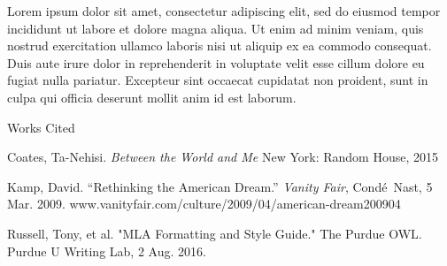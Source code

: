\documentclass[12pt]{article}
\newcommand{\bibent}{\noindent \hangindent 40pt}
\newenvironment{workscited}{\begin{center} Works Cited \end{center}}{\newpage }
\begin{document}
\begin{flushleft}
Lorem ipsum dolor sit amet, consectetur adipiscing elit, sed do eiusmod tempor incididunt ut labore et dolore magna aliqua. Ut enim ad minim veniam, quis nostrud exercitation ullamco laboris nisi ut aliquip ex ea commodo consequat. Duis aute irure dolor in reprehenderit in voluptate velit esse cillum dolore eu fugiat nulla pariatur. Excepteur sint occaecat cupidatat non proident, sunt in culpa qui officia deserunt mollit anim id est laborum.

\begin{workscited}

\bibent
Coates, Ta-Nehisi. \textit{Between the World and Me} New York: Random House, 2015

\bibent
Kamp, David. “Rethinking the American Dream.” \textit{Vanity Fair}, Cond\'e\ Nast, 5 Mar. 2009. www.vanityfair.com/culture/2009/04/american-dream200904

\bibent
Russell, Tony, et al. "MLA Formatting and Style Guide." The Purdue OWL. Purdue U Writing Lab, 2 Aug. 2016.

\end{workscited}

\end{flushleft}
\end{document}
